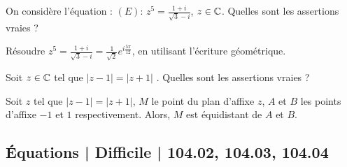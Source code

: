\begin{question} 

On considère l'équation : $(E) : \, z^5= \frac{1+i}{\sqrt 3-i}$, $z\in \mathbb{C}$.   Quelles sont les assertions vraies ?
\begin{answers}
    

    
\end{answers}
\begin{explanations}
Résoudre $ z^5= \frac{1+i}{\sqrt 3-i}= \frac{1}{\sqrt 2} e^{i\frac{5\pi}{12}}$, en utilisant l'écriture géométrique.
\end{explanations}

\end{question}





\begin{question} 

Soit $z\in \mathbb{C}$ tel que $|z-1|=|z+1|$ .  Quelles sont les assertions vraies ?
\begin{answers}
    

    
\end{answers}
\begin{explanations}
Soit $z$ tel que $|z-1|=|z+1|$, $M$ le point du plan d'affixe $z$,  $A$ et $B$ les points d'affixe $-1$ et $1$
respectivement. Alors, $M$ est équidistant de $A$ et $B$.

\end{explanations}

\end{question}



\subsection{Équations | Difficile | 104.02, 104.03, 104.04}

